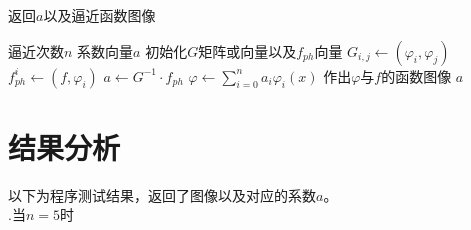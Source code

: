 \documentclass[UTF8,ctexart,a4paper,11pt,openany]{article}
\theoremstyle{definition}
\newcommand\e{\leftarrow}
\begin{document}
\begin{algorithm}[H]
    \caption{返回$a$以及逼近函数图像}
    \begin{algorithmic}[1]
        \Require 逼近次数$n$
        \Ensure 系数向量$a$
            \State 初始化$G$矩阵或向量以及$f_{ph}$向量
                    \State $G_{i,j}\e (\varphi_i, \varphi_j)$
                \EndFor 
                \State $f_{ph}^i \e (f,\varphi_i)$
            \EndFor
            \State $a \e G^{-1}\cdot f_{ph}$
            \State $\varphi \gets \sum_{i=0}^n a_i\varphi_i(x)$
            \State 作出$\varphi $与$f$的函数图像
            \State \Return $a$
        \EndFunction
    \end{algorithmic}
\end{algorithm}
\section{结果分析}%
以下为程序测试结果，返回了图像以及对应的系数$a$。\\ .\;当$n=5$时\\
\end{document}
